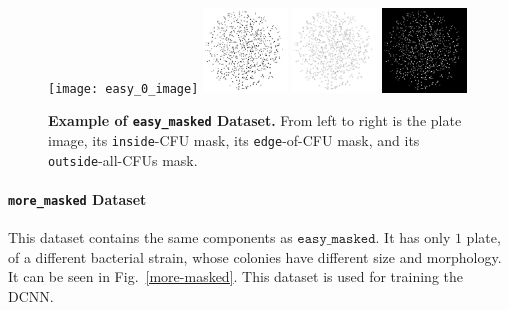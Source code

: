 \documentclass[10pt,letterpaper]{article}
\begin{document}
            \begin{figure}[h]
                \texttt{[image: easy\_0\_image]}
                \includegraphics[width=0.2\textwidth]{easy_0_inside}
                \includegraphics[width=0.2\textwidth]{easy_0_edge}
                \includegraphics[width=0.2\textwidth]{easy_0_outside}
                \caption{{\bf Example of \texttt{easy\_masked} Dataset.} From left to right is the plate image, its \texttt{inside}-CFU mask, its \texttt{edge}-of-CFU mask, and its \texttt{outside}-all-CFUs mask.}
                \label{easy-masked}
            \end{figure}

        \paragraph*{\texttt{more\_masked} Dataset}
            This dataset contains the same components as $\texttt{easy\_masked}$. It has only $1$ plate, of a different bacterial strain, whose colonies have different size and morphology. It can be seen in Fig.~\ref{more-masked}. This dataset is used for training the DCNN.
        
\end{document}
